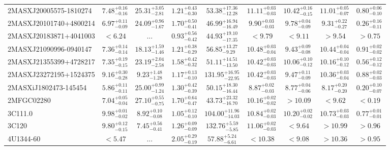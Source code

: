 \documentclass[onecolumn]{mn2e}
\begin{document}
{\begin{center}
\begin{longtable}{lcccccccc}
2MASXJ20005575-1810274 & $7.48_{-0.16}^{+0.16}$ & $25.31_{-2.81}^{+3.05}$ & $1.21_{-0.30}^{+0.43}$ &$53.38_{-12.28}^{+17.36}$ & $11.11_{-0.03}^{+0.03}$ & $10.42_{-0.15}^{+0.16}$ & $11.01_{-0.07}^{+0.05}$ & $0.80_{-0.10}^{+0.06}$ \\
2MASXJ20101740+4800214 & $6.97_{-0.09}^{+0.11}$ & $24.09_{-1.67}^{+0.96}$ & $1.70_{-0.41}^{+0.50}$ &$46.99_{-16.49}^{+16.94}$ & $9.90_{-0.03}^{+0.03}$ & $9.78_{-0.09}^{+0.04}$ & $9.31_{-0.27}^{+0.22}$ & $0.26_{-0.11}^{+0.16}$ \\
2MASXJ20183871+4041003 & $<6.24$ & ... & $0.93_{-0.42}^{+0.56}$ &$44.93_{-17.35}^{+19.10}$ & $<9.79$ & $<9.11$ & $>9.54$ & $>0.75$ \\
2MASXJ21090996-0940147 & $7.36_{-0.14}^{+0.14}$ & $18.13_{-1.46}^{+1.59}$ & $1.21_{-0.29}^{+0.38}$ &$56.85_{-9.29}^{+13.27}$ & $10.48_{-0.04}^{+0.03}$ & $9.43_{-0.08}^{+0.09}$ & $10.44_{-0.04}^{+0.04}$ & $0.91_{-0.02}^{+0.02}$ \\
2MASXJ21355399+4728217 & $7.35_{-0.15}^{+0.19}$ & $23.19_{-2.58}^{+2.04}$ & $1.58_{-0.32}^{+0.42}$ &$51.11_{-13.50}^{+14.51}$ & $10.42_{-0.03}^{+0.03}$ & $10.06_{-0.12}^{+0.10}$ & $10.16_{-0.12}^{+0.10}$ & $0.56_{-0.12}^{+0.12}$ \\
2MASXJ23272195+1524375 & $9.16_{-0.28}^{+0.30}$ & $9.23_{-1.28}^{+1.48}$ & $1.17_{-0.10}^{+0.13}$ &$131.95_{-22.95}^{+16.95}$ & $10.42_{-0.03}^{+0.03}$ & $9.47_{-0.09}^{+0.11}$ & $10.36_{-0.04}^{+0.03}$ & $0.88_{-0.03}^{+0.02}$ \\
2MASXiJ1802473-145454 & $5.86_{-0.11}^{+0.11}$ & $25.00_{-1.24}^{+0.99}$ & $1.30_{-0.39}^{+0.42}$ &$50.15_{-16.44}^{+18.30}$ & $8.87_{-0.03}^{+0.02}$ & $8.77_{-0.06}^{+0.04}$ & $8.17_{-0.20}^{+0.20}$ & $0.20_{-0.07}^{+0.10}$ \\
2MFGC02280 & $7.04_{-0.04}^{+0.05}$ & $27.10_{-0.75}^{+0.55}$ & $1.70_{-0.47}^{+0.64}$ &$43.73_{-16.70}^{+23.32}$ & $10.16_{-0.02}^{+0.02}$ & $>10.09$ & $<9.62$ & $<0.19$ \\
3C111.0 & $9.98_{-0.02}^{+0.01}$ & $8.92_{-0.08}^{+0.10}$ & $1.05_{-0.10}^{+0.12}$ &$104.00_{-14.03}^{+11.96}$ & $10.84_{-0.03}^{+0.02}$ & $10.20_{-0.02}^{+0.02}$ & $10.73_{-0.03}^{+0.03}$ & $0.77_{-0.01}^{+0.01}$ \\
3C120 & $9.80_{-0.15}^{+0.12}$ & $7.45_{-0.41}^{+0.56}$ & $1.26_{-0.09}^{+0.09}$ &$132.76_{-5.85}^{+5.59}$ & $11.06_{-0.03}^{+0.02}$ & $<9.64$ & $>10.99$ & $>0.96$ \\
4U1344-60 & $<5.47$ & ... & $2.05_{-0.19}^{+0.29}$ &$57.88_{-6.61}^{+5.24}$ & $<10.38$ & $<9.08$ & $>10.36$ & $>0.95$ \\

\end{longtable}
\end{center}}
\end{document}
